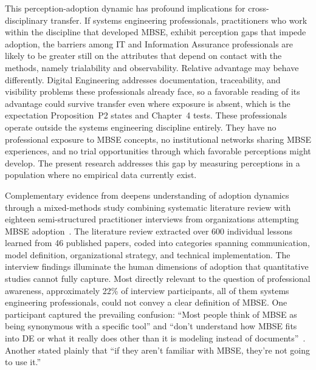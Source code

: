 This perception-adoption dynamic has profound implications for cross-disciplinary transfer. If systems engineering professionals, practitioners who work within the discipline that developed MBSE, exhibit perception gaps that impede adoption, the barriers among IT and Information Assurance professionals are likely to be greater still on the attributes that depend on contact with the methods, namely trialability and observability. Relative advantage may behave differently. Digital Engineering addresses documentation, traceability, and visibility problems these professionals already face, so a favorable reading of its advantage could survive transfer even where exposure is absent, which is the expectation Proposition~P2 states and Chapter~4 tests. These professionals operate outside the systems engineering discipline entirely. They have no professional exposure to MBSE concepts, no institutional networks sharing MBSE experiences, and no trial opportunities through which favorable perceptions might develop. The present research addresses this gap by measuring perceptions in a population where no empirical data currently exist.

Complementary evidence from \citeauthor{Henderson_McDermott_Salado_2024} deepens understanding of adoption dynamics through a mixed-methods study combining systematic literature review with eighteen semi-structured practitioner interviews from organizations attempting MBSE adoption~\parencite{Henderson_McDermott_Salado_2024}. The literature review extracted over 600 individual lessons learned from 46 published papers, coded into categories spanning communication, model definition, organizational strategy, and technical implementation. The interview findings illuminate the human dimensions of adoption that quantitative studies cannot fully capture. Most directly relevant to the question of professional awareness, approximately 22\% of interview participants, all of them systems engineering professionals, could not convey a clear definition of MBSE\@. One participant captured the prevailing confusion: ``Most people think of MBSE as being synonymous with a specific tool'' and ``don't understand how MBSE fits into DE or what it really does other than it is modeling instead of documents''~\parencite{Henderson_McDermott_Salado_2024}. Another stated plainly that ``if they aren't familiar with MBSE, they're not going to use it.''

